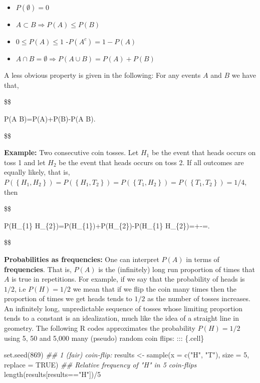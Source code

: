 \documentclass[
  letterpaper,
  DIV=11,
  numbers=noendperiod]{scrreprt}
\newenvironment{Shaded}{\begin{snugshade}}{\end{snugshade}}
\newcommand{\AttributeTok}[1]{\textcolor[rgb]{0.40,0.45,0.13}{#1}}
\newcommand{\ConstantTok}[1]{\textcolor[rgb]{0.56,0.35,0.01}{#1}}
\newcommand{\DecValTok}[1]{\textcolor[rgb]{0.68,0.00,0.00}{#1}}
\newcommand{\DocumentationTok}[1]{\textcolor[rgb]{0.37,0.37,0.37}{\textit{#1}}}
\newcommand{\FunctionTok}[1]{\textcolor[rgb]{0.28,0.35,0.67}{#1}}
\newcommand{\NormalTok}[1]{\textcolor[rgb]{0.00,0.23,0.31}{#1}}
\newcommand{\OtherTok}[1]{\textcolor[rgb]{0.00,0.23,0.31}{#1}}
\newcommand{\SpecialCharTok}[1]{\textcolor[rgb]{0.37,0.37,0.37}{#1}}
\newcommand{\StringTok}[1]{\textcolor[rgb]{0.13,0.47,0.30}{#1}}
\providecommand{\tightlist}{%
  \setlength{\itemsep}{0pt}\setlength{\parskip}{0pt}}\usepackage{longtable,booktabs,array}
\theoremstyle{definition}
\theoremstyle{plain}
\theoremstyle{plain}
\theoremstyle{remark}
\begin{document}
\begin{itemize}
\tightlist
\item
  \(P(\emptyset)=0\)
\item
  \(A \subset B\Rightarrow P(A) \leq P(B)\)
\item
  \(0 \leq P(A) \leq 1\) -\(P\left(A^{c}\right)=1-P(A)\)
\item
  \(A \cap B=\emptyset \Rightarrow P(A \cup B)=P(A)+P(B)\)
\end{itemize}

A less obvious property is given in the following: For any events \(A\)
and \(B\) we have that,

\$\$

P(A \cup B)=P(A)+P(B)-P(A B).

\$\$

\textbf{Example:} Two consecutive coin tosses. Let \(H_{1}\) be the
event that heads occurs on toss 1 and let \(H_{2}\) be the event that
heads occurs on toss 2. If all outcomes are equally likely, that is,
\(P\left(\left\{H_{1}, H_{2}\right\}\right)=P\left(\left\{H_{1}, T_{2}\right\}\right)=P\left(\left\{T_{1}, H_{2}\right\}\right)=P\left(\left\{T_{1}, T_{2}\right\}\right)=1 / 4\),
then

\$\$

P\left(H\_\{1\}
\cup H\_\{2\}\right)=P\left(H\_\{1\}\right)+P\left(H\_\{2\}\right)-P\left(H\_\{1\}
H\_\{2\}\right)=+-=.

\$\$

\textbf{Probabilities as frequencies:} One can interpret \(P(A)\) in
terms of \textbf{frequencies}. That is, \(P(A)\) is the (infinitely)
long run proportion of times that \(A\) is true in repetitions. For
example, if we say that the probability of heads is \(1 / 2\), i.e
\(P(H)=1/2\) we mean that if we flip the coin many times then the
proportion of times we get heads tends to \(1 / 2\) as the number of
tosses increases. An infinitely long, unpredictable sequence of tosses
whose limiting proportion tends to a constant is an idealization, much
like the idea of a straight line in geometry. \newline The following
\textsf{R} codes approximates the probability \(P(H)=1/2\) using 5, 50
and 5,000 many (pseudo) random coin flips: ::: \{.cell\}

\begin{Shaded}
\begin{Highlighting}[]
\FunctionTok{set.seed}\NormalTok{(}\DecValTok{869}\NormalTok{)}
\DocumentationTok{\#\# 1 (fair) coin{-}flip:}
\NormalTok{results }\OtherTok{\textless{}{-}} \FunctionTok{sample}\NormalTok{(}\AttributeTok{x =} \FunctionTok{c}\NormalTok{(}\StringTok{"H"}\NormalTok{, }\StringTok{"T"}\NormalTok{), }\AttributeTok{size =} \DecValTok{5}\NormalTok{, }\AttributeTok{replace =} \ConstantTok{TRUE}\NormalTok{)}
\DocumentationTok{\#\# Relative frequency of "H" in 5 coin{-}flips}
\FunctionTok{length}\NormalTok{(results[results}\SpecialCharTok{==}\StringTok{"H"}\NormalTok{])}\SpecialCharTok{/}\DecValTok{5}
\end{Highlighting}
\end{Shaded}
\end{document}
